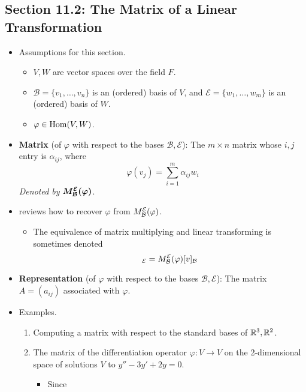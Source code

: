 \documentclass[../notes.tex]{subfiles}
\begin{document}
\subsection*{Section 11.2: The Matrix of a Linear Transformation}
\begin{itemize}
    \item Assumptions for this section.
    \begin{itemize}
        \item $V,W$ are vector spaces over the field $F$.
        \item $\mathcal{B}=\{v_1,\dots,v_n\}$ is an (ordered) basis of $V$, and $\mathcal{E}=\{w_1,\dots,w_m\}$ is an (ordered) basis of $W$.
        \item $\varphi\in\operatorname{Hom}(V,W)$.
    \end{itemize}
    \item \textbf{Matrix} (of $\varphi$ with respect to the bases $\mathcal{B},\mathcal{E}$): The $m\times n$ matrix whose $i,j$ entry is $\alpha_{ij}$, where
    \begin{equation*}
        \varphi(v_j) = \sum_{i=1}^m\alpha_{ij}w_i
    \end{equation*}
    \emph{Denoted by} $\bm{M_\mathcal{B}^\mathcal{E}(\varphi)}$.
    \item \textcite{bib:DummitFoote} reviews how to recover $\varphi$ from $M_\mathcal{B}^\mathcal{E}(\varphi)$.
    \begin{itemize}
        \item The equivalence of matrix multiplying and linear transforming is sometimes denoted
        \begin{equation*}
            [\varphi(v)]_\mathcal{E} = \mat{B}{E}{\varphi}[v]_\mathcal{B}
        \end{equation*}
    \end{itemize}
    \item \textbf{Representation} (of $\varphi$ with respect to the bases $\mathcal{B},\mathcal{E}$): The matrix $A=(a_{ij})$ associated with $\varphi$.
    \item Examples.
    \begin{enumerate}
        \item Computing a matrix with respect to the standard bases of $\mathbb{R}^3,\mathbb{R}^2$.
        \item The matrix of the differentiation operator $\varphi:V\to V$ on the 2-dimensional space of solutions $V$ to $y''-3y'+2y=0$.
        \begin{itemize}
            \item Since
            \begin{align*}

\end{align*}
\end{itemize}
\end{enumerate}
\end{itemize}
\end{document}
